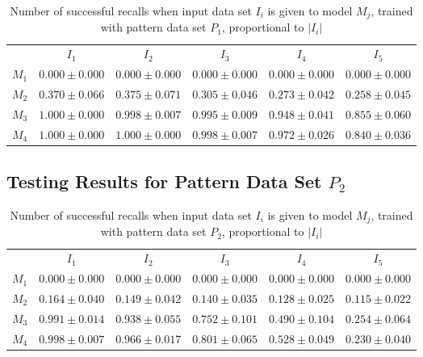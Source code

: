 \documentclass[anon]{CI}
\begin{document}
		\begin{table}[H]
			\centering
			\def\arraystretch{1.5}
			\footnotesize
			\begin{tabular}{cccccc}
				
				& $I_{1}$  & $I_{2}$  & $I_{3}$  & $I_{4}$  & $I_{5}$ \\ \cline{2-6}
				$M_{1}$  & $0.000\pm0.000$  & $0.000\pm0.000$  & $0.000\pm0.000$  & $0.000\pm0.000$  & $0.000\pm0.000$ \\
				$M_{2}$  & $0.370\pm0.066$  & $0.375\pm0.071$  & $0.305\pm0.046$  & $0.273\pm0.042$  & $0.258\pm0.045$ \\
				$M_{3}$  & $1.000\pm0.000$  & $0.998\pm0.007$  & $0.995\pm0.009$  & $0.948\pm0.041$  & $0.855\pm0.060$ \\
				$M_{4}$  & $1.000\pm0.000$  & $1.000\pm0.000$  & $0.998\pm0.007$  & $0.972\pm0.026$  & $0.840\pm0.036$ \\
				
			\end{tabular}
			\caption{Number of successful recalls when input data set $I_i$ is given to model $M_j$, trained with pattern data set $P_{1}$, proportional to $\left|I_i\right|$}
		\end{table}
		
		\subsection{Testing Results for Pattern Data Set $P_{2}$}
		
		
		\begin{table}[H]
			\centering
			\def\arraystretch{1.5}
			\footnotesize
			\begin{tabular}{cccccc}
				
				& $I_{1}$  & $I_{2}$  & $I_{3}$  & $I_{4}$  & $I_{5}$ \\ \cline{2-6}
				$M_{1}$  & $0.000\pm0.000$  & $0.000\pm0.000$  & $0.000\pm0.000$  & $0.000\pm0.000$  & $0.000\pm0.000$ \\
				$M_{2}$  & $0.164\pm0.040$  & $0.149\pm0.042$  & $0.140\pm0.035$  & $0.128\pm0.025$  & $0.115\pm0.022$ \\
				$M_{3}$  & $0.991\pm0.014$  & $0.938\pm0.055$  & $0.752\pm0.101$  & $0.490\pm0.104$  & $0.254\pm0.064$ \\
				$M_{4}$  & $0.998\pm0.007$  & $0.966\pm0.017$  & $0.801\pm0.065$  & $0.528\pm0.049$  & $0.230\pm0.040$ \\
				
			\end{tabular}
			\caption{Number of successful recalls when input data set $I_i$ is given to model $M_j$, trained with pattern data set $P_{2}$, proportional to $\left|I_i\right|$}
		\end{table}
		
\end{document}
